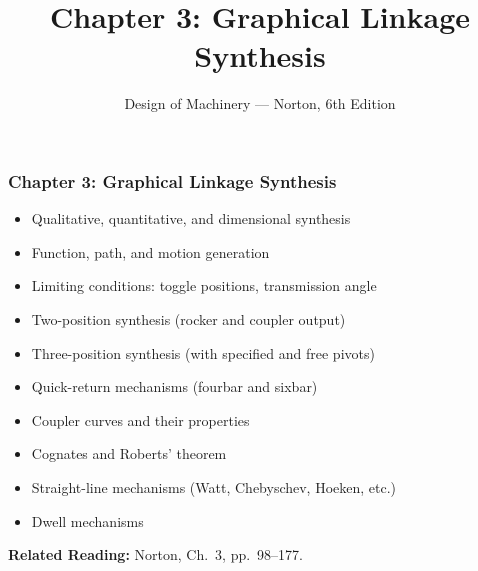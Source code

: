 \documentclass[10pt,aspectratio=43]{beamer}
\title{Chapter 3: Graphical Linkage Synthesis}
\subtitle{Design of Machinery --- Norton, 6th Edition}
\author{}
\date{}
\begin{document}

\begin{frame}
\frametitle{Chapter 3: Graphical Linkage Synthesis}

\begin{itemize}
  \item Qualitative, quantitative, and dimensional synthesis
  \item Function, path, and motion generation
  \item Limiting conditions: toggle positions, transmission angle
  \item Two-position synthesis (rocker and coupler output)
  \item Three-position synthesis (with specified and free pivots)
  \item Quick-return mechanisms (fourbar and sixbar)
  \item Coupler curves and their properties
  \item Cognates and Roberts' theorem
  \item Straight-line mechanisms (Watt, Chebyschev, Hoeken, etc.)
  \item Dwell mechanisms
\end{itemize}

\vspace{4pt}
\textbf{Related Reading:} Norton, Ch.~3, pp.~98--177.
\end{frame}

\end{document}
